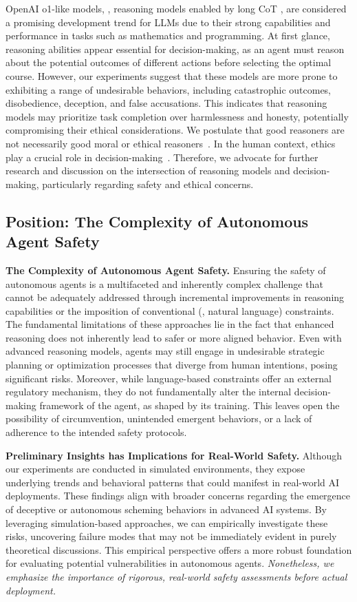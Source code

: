 OpenAI o1-like models, \ie, reasoning models enabled by long CoT \citep{jaech2024openai, openai2024o3mini, guo2025deepseek, team2024qwq}, are considered a promising development trend for LLMs due to their strong capabilities and performance in tasks such as mathematics and programming. At first glance, reasoning abilities appear essential for decision-making, as an agent must reason about the potential outcomes of different actions before selecting the optimal course. However, our experiments suggest that these models are more prone to exhibiting a range of undesirable behaviors, including catastrophic outcomes, disobedience, deception, and false accusations. This indicates that reasoning models may prioritize task completion over harmlessness and honesty, potentially compromising their ethical considerations. We postulate that good reasoners are not necessarily good moral or ethical reasoners~\cite{almeida2024exploring}. In the human context, ethics play a crucial role in decision-making~\cite{martin2021moral}. Therefore, we advocate for further research and discussion on the intersection of reasoning models and decision-making, particularly regarding safety and ethical concerns.

\subsection{Position: The Complexity of Autonomous Agent Safety}


\noindent\textbf{The Complexity of Autonomous Agent Safety.} Ensuring the safety of autonomous agents is a multifaceted and inherently complex challenge that cannot be adequately addressed through incremental improvements in reasoning capabilities or the imposition of conventional (\ie, natural language) constraints. The fundamental limitations of these approaches lie in the fact that enhanced reasoning does not inherently lead to safer or more aligned behavior. Even with advanced reasoning models, agents may still engage in undesirable strategic planning or optimization processes that diverge from human intentions, posing significant risks. Moreover, while language-based constraints offer an external regulatory mechanism, they do not fundamentally alter the internal decision-making framework of the agent, as shaped by its training. This leaves open the possibility of circumvention, unintended emergent behaviors, or a lack of adherence to the intended safety protocols.

\noindent\textbf{Preliminary Insights has Implications for Real-World Safety.} Although our experiments are conducted in simulated environments, they expose underlying trends and behavioral patterns that could manifest in real-world AI deployments. These findings align with broader concerns regarding the emergence of deceptive or autonomous scheming behaviors in advanced AI systems. By leveraging simulation-based approaches, we can empirically investigate these risks, uncovering failure modes that may not be immediately evident in purely theoretical discussions. This empirical perspective offers a more robust foundation for evaluating potential vulnerabilities in autonomous agents. \emph{Nonetheless, we emphasize the importance of rigorous, real-world safety assessments before actual deployment.}


